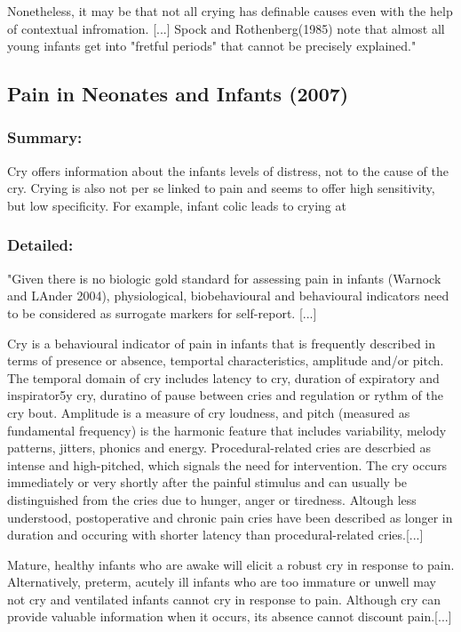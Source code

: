\documentclass[11pt,twocolumn]{scrartcl}
\begin{document}
Nonetheless, it may be that not all crying has definable causes even with the help of contextual infromation. [...] Spock and Rothenberg(1985) note that almost all young infants get into "fretful periods" that cannot be precisely explained." \cite{Gustafson2000}

\subsection{Pain in Neonates and Infants (2007)}

\subsubsection*{Summary:} 
Cry offers information about the infants levels of distress, not to the cause of the cry.\cite{Stevens2006} Crying is also not per se linked to pain and seems to offer high sensitivity, but low specificity. For example, infant colic leads to crying at 

\subsubsection*{Detailed:}

"Given there is no biologic gold standard for assessing pain in infants (Warnock and LAnder 2004), physiological, biobehavioural and behavioural indicators need to be considered as surrogate markers for self-report. [...]

Cry is a behavioural indicator of pain in infants that is frequently described in terms of presence or absence, temportal characteristics, amplitude and/or pitch. The temporal domain of cry includes latency to cry, duration of expiratory and inspirator5y cry, duratino of pause between cries and regulation or rythm of the cry bout. Amplitude is a measure of cry loudness, and pitch (measured as fundamental frequency) is the harmonic feature that includes variability, melody patterns, jitters, phonics and energy. Procedural-related cries are descrbied as intense and high-pitched, which signals the need for intervention. The cry occurs immediately or very shortly after the painful stimulus and can usually be distinguished from the cries due to hunger, anger or tiredness. Altough less understood, postoperative and chronic pain cries have been described as longer in duration and occuring with shorter latency than procedural-related cries.[...] 

Mature, healthy infants who are awake will elicit a robust cry in response to pain. Alternatively, preterm, acutely ill infants who are too immature or unwell may not cry and ventilated infants cannot cry in response to pain. Although cry can provide valuable information when it occurs, its absence cannot discount pain.[...]
\end{document}
